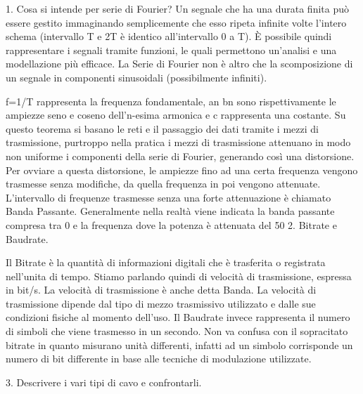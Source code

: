 1.	Cosa si intende per serie di Fourier?
Un segnale che ha una durata finita può essere gestito immaginando semplicemente che esso ripeta infinite volte l’intero schema (intervallo T e 2T è identico all’intervallo 0 a T).
È possibile quindi rappresentare i segnali tramite funzioni, le quali permettono un’analisi e una modellazione più efficace.
La Serie di Fourier non è altro che la scomposizione di un segnale in componenti sinusoidali (possibilmente infiniti).
 
f=1/T rappresenta la frequenza fondamentale, an  bn  sono rispettivamente le ampiezze seno e coseno dell’n-esima armonica e c rappresenta una costante.
	Su questo teorema si basano le reti e il passaggio dei dati tramite i mezzi di trasmissione, purtroppo 	nella pratica i mezzi di trasmissione attenuano in modo non uniforme i componenti della serie di 	Fourier, generando così una distorsione. Per ovviare a questa distorsione, le ampiezze fino ad una 	certa frequenza vengono trasmesse senza modifiche, da quella frequenza in poi vengono attenuate.
	L’intervallo di frequenze trasmesse senza una forte attenuazione è chiamato Banda Passante.
Generalmente nella realtà viene indicata la banda passante compresa tra 0 e la frequenza dove la potenza è attenuata del 50%
2.	Bitrate e Baudrate.

Il Bitrate è la quantità di informazioni digitali che è trasferita o registrata nell’unita di tempo.
Stiamo parlando quindi di velocità di trasmissione, espressa in bit/s. La velocità di trasmissione è anche detta Banda. La velocità di trasmissione dipende dal tipo di mezzo trasmissivo utilizzato e dalle sue condizioni fisiche al momento dell’uso.
Il Baudrate invece rappresenta il numero di simboli che viene trasmesso in un secondo. Non va confusa con il sopracitato bitrate in quanto misurano unità differenti, infatti ad un simbolo corrisponde un numero di bit differente in base alle tecniche di modulazione utilizzate.

3.	Descrivere i vari tipi di cavo e confrontarli.

